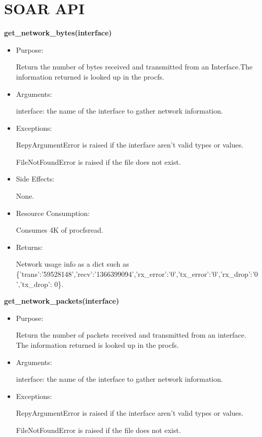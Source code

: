 \chapter{SOAR API}
\label{AppendixA}
{\raggedright
\textbf{get\_network\_bytes(interface)}
\begin{itemize}
\item Purpose:

Return the number of bytes received and transmitted from an Interface.The
information returned is looked up in the procfs.

\item Arguments:

interface: the name of the interface to gather network information.

\item Exceptions:

RepyArgumentError is raised if the interface aren't valid types or values.

FileNotFoundError is raised if the file does not exist.

\item Side Effects:

None.

\item Resource Consumption:

Consumes 4K of procfsread.

\item Returns:

Network usage info as a dict such as \{'trans':'59528148','recv':'1366399094','rx\_error':'0','tx\_error':'0','rx\_drop':'0','tx\_drop': 0\}.
\end{itemize}

\textbf{get\_network\_packets(interface)}
\begin{itemize}
\item Purpose:

Return the number of packets received and transmitted from an interface.
The information returned is looked up in the procfs.

\item Arguments:

interface: the name of the interface to gather network information.

\item Exceptions:

RepyArgumentError is raised if the interface aren't valid types or values.

FileNotFoundError is raised if the file does not exist.


\end{itemize}}
